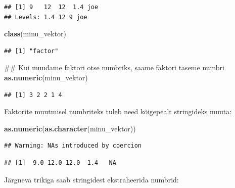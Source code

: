 \documentclass[]{book}
\newenvironment{Shaded}{\begin{snugshade}}{\end{snugshade}}
\newcommand{\KeywordTok}[1]{\textcolor[rgb]{0.13,0.29,0.53}{\textbf{#1}}}
\newcommand{\DecValTok}[1]{\textcolor[rgb]{0.00,0.00,0.81}{#1}}
\newcommand{\StringTok}[1]{\textcolor[rgb]{0.31,0.60,0.02}{#1}}
\newcommand{\NormalTok}[1]{#1}
\begin{document}
\begin{verbatim}
## [1] 9   12  12  1.4 joe
## Levels: 1.4 12 9 joe
\end{verbatim}

\begin{Shaded}
\begin{Highlighting}[]
\KeywordTok{class}\NormalTok{(minu_vektor)}
\end{Highlighting}
\end{Shaded}

\begin{verbatim}
## [1] "factor"
\end{verbatim}

\begin{Shaded}
\begin{Highlighting}[]
\NormalTok{## Kui muudame faktori otse numbriks, saame faktori taseme numbri}
\KeywordTok{as.numeric}\NormalTok{(minu_vektor)}
\end{Highlighting}
\end{Shaded}

\begin{verbatim}
## [1] 3 2 2 1 4
\end{verbatim}

Faktorite muutmisel numbriteks tuleb need kõigepealt stringideks muuta:

\begin{Shaded}
\begin{Highlighting}[]
\KeywordTok{as.numeric}\NormalTok{(}\KeywordTok{as.character}\NormalTok{(minu_vektor))}
\end{Highlighting}
\end{Shaded}

\begin{verbatim}
## Warning: NAs introduced by coercion
\end{verbatim}

\begin{verbatim}
## [1]  9.0 12.0 12.0  1.4   NA
\end{verbatim}

Järgneva trikiga saab stringidest ekstraheerida numbrid:

\begin{Shaded}
\end{Shaded}
\end{document}
